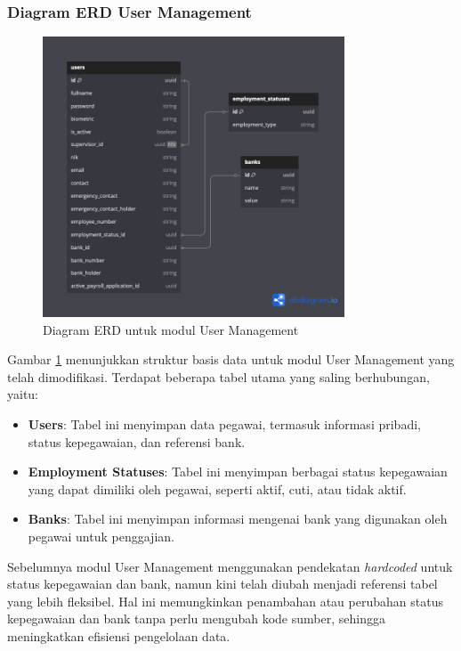 \subsubsection{Diagram ERD User Management}
\begin{figure}[H]
    \centering
    \includegraphics[width=0.8\textwidth]{assets/pics/fig_erd_user_management.png}
    \caption{Diagram ERD untuk modul User Management}
    \label{fig:erd_user_management}
\end{figure}

Gambar \ref{fig:erd_user_management} menunjukkan struktur basis data untuk modul User Management yang telah dimodifikasi. Terdapat beberapa tabel utama yang saling berhubungan, yaitu:
\begin{itemize}
    \item \textbf{Users}: Tabel ini menyimpan data pegawai, termasuk informasi pribadi, status kepegawaian, dan referensi bank.
    \item \textbf{Employment Statuses}: Tabel ini menyimpan berbagai status kepegawaian yang dapat dimiliki oleh pegawai, seperti aktif, cuti, atau tidak aktif.
    \item \textbf{Banks}: Tabel ini menyimpan informasi mengenai bank yang digunakan oleh pegawai untuk penggajian.
\end{itemize}

Sebelumnya modul User Management menggunakan pendekatan \textit{hardcoded} untuk status kepegawaian dan bank, namun kini telah diubah menjadi referensi tabel yang lebih fleksibel. Hal ini memungkinkan penambahan atau perubahan status kepegawaian dan bank tanpa perlu mengubah kode sumber, sehingga meningkatkan efisiensi pengelolaan data.

